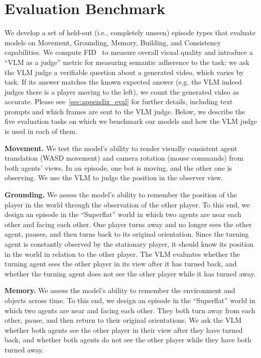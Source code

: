 

\section{Evaluation Benchmark}
\label{sec:eval}

We develop a set of held-out (i.e., completely unseen) episode types that evaluate models on Movement, Grounding, Memory, Building, and Consistency capabilities. We compute FID~\cite{heusel2017gans} to measure overall visual quality and introduce a ``VLM as a judge'' metric for measuring semantic adherence to the task: we ask the VLM judge a verifiable question about a generated video, which varies by task. If its answer matches the known expected answer (e.g. the VLM indeed judges there is a player moving to the left), we count the generated video as accurate. Please see~\cref{sec:appendix_eval} for further details, including text prompts and which frames are sent to the VLM judge. Below, we describe the five evaluation tasks on which we benchmark our models and how the VLM judge is used in each of them.

\textbf{Movement.} We test the model's ability to render visually consistent agent translation (WASD movement) and camera rotation (mouse commands) from both agents' views. In an episode, one bot is moving, and the other one is observing. We use the VLM to judge the position in the observer view.

\textbf{Grounding.} We assess the model's ability to remember the position of the player in the world through the observation of the other player. To this end, we design an episode in the ``Superflat'' world in which two agents are near each other and facing each other. One player turns away and no longer sees the other agent, pauses, and then turns back to its original orientation. Since the turning agent is constantly observed by the stationary player, it should know its position in the world in relation to the other player. The VLM evaluates whether the turning agent sees the other player in its view after it has turned back, and whether the turning agent does not see the other player while it has turned away.

\textbf{Memory.} We assess the model's ability to remember the environment and objects across time. To this end, we design an episode in the ``Superflat'' world in which two agents are near and facing each other. They both turn away from each other, pause, and then return to their original orientations. We ask the VLM whether both agents see the other player in their view after they have turned back, and whether both agents do not see the other player while they have both turned away.

